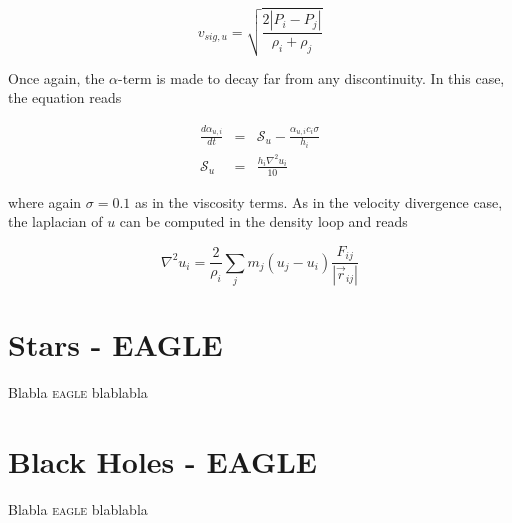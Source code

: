 \documentclass[a4paper,10pt]{report}
\newcommand{\eagle}{\textsc{eagle }}
\begin{document}
\begin{equation}
 v_{sig,u} = \sqrt{\frac{2|P_i-P_j|}{\rho_i+\rho_j}}
\end{equation}

Once again, the $\alpha$-term is made to decay far from any discontinuity. In this case, the equation reads

\begin{eqnarray}
 \frac{d\alpha_{u,i}}{dt} &=&  \mathcal{S}_u - \frac{\alpha_{u,i}c_i\sigma}{h_i}  \\
 \mathcal{S}_u &=& \frac{h_i \nabla^2 u_i}{10}
\end{eqnarray}

where again $\sigma=0.1$ as in the viscosity terms. As in the velocity divergence case, the laplacian of $u$ can be
computed in the density loop and reads

\begin{equation}
 \nabla^2 u_i = \frac{2}{\rho_i} \sum_j m_j \left(u_j - u_i\right) \frac{F_{ij}}{|\vec{r}_{ij}|}
\end{equation}




\chapter{Stars - EAGLE}
\label{chap:stars}

Blabla \eagle blablabla

\chapter{Black Holes - EAGLE}
\label{chap:BHs}

Blabla \eagle blablabla
\end{document}
